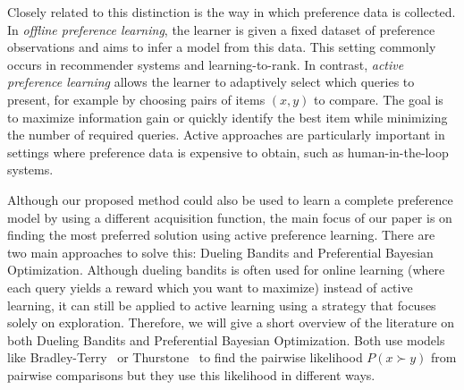 \documentclass{article}
\begin{document}
Closely related to this distinction is the way in which preference data is collected. In \emph{offline preference learning}, the learner is given a fixed dataset of preference observations and aims to infer a model from this data. This setting commonly occurs in recommender systems and learning-to-rank. In contrast, \emph{active preference learning} allows the learner to adaptively select which queries to present, for example by choosing pairs of items $(x, y)$ to compare. The goal is to maximize information gain or quickly identify the best item while minimizing the number of required queries. Active approaches are particularly important in settings where preference data is expensive to obtain, such as human-in-the-loop systems.

Although our proposed method could also be used to learn a complete preference model by using a different acquisition function, the main focus of our paper is on finding the most preferred solution using active preference learning. There are two main approaches to solve this: Dueling Bandits and Preferential Bayesian Optimization. Although dueling bandits is often used for online learning (where each query yields a reward which you want to maximize) instead of active learning, it can still be applied to active learning using a strategy that focuses solely on exploration. Therefore, we will give a short overview of the literature on both Dueling Bandits and Preferential Bayesian Optimization. Both use models like Bradley-Terry~\cite{BradleyTerry1952} or Thurstone~\cite{thurstone1927law} to find the pairwise likelihood $P(x \succ y)$ from pairwise comparisons but they use this likelihood in different ways.
\end{document}
